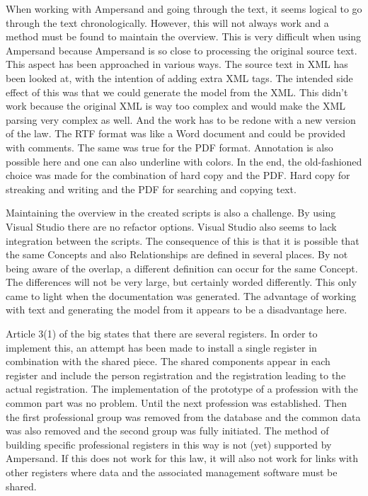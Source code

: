 When working with Ampersand and going through the text, it seems logical to go through the text chronologically.
However, this will not always work and a method must be found to maintain the overview.
This is very difficult when using Ampersand because Ampersand is so close to processing the original source text.
This aspect has been approached in various ways.
The source text in XML has been looked at, with the intention of adding extra XML tags.
The intended side effect of this was that we could generate the model from the XML.
This didn't work because the original XML is way too complex and would make the XML parsing very complex as well.
And the work has to be redone with a new version of the law.
The RTF format was like a Word document and could be provided with comments.
The same was true for the PDF format.
Annotation is also possible here and one can also underline with colors.
In the end, the old-fashioned choice was made for the combination of hard copy and the PDF.
Hard copy for streaking and writing and the PDF for searching and copying text.

Maintaining the overview in the created scripts is also a challenge.
By using Visual Studio there are no refactor options.
Visual Studio also seems to lack integration between the scripts.
The consequence of this is that it is possible that the same Concepts and also Relationships are defined in several places.
By not being aware of the overlap, a different definition can occur for the same Concept.
The differences will not be very large, but certainly worded differently.
This only came to light when the documentation was generated.
The advantage of working with text and generating the model from it appears to be a disadvantage here.

Article 3(1) of the \acrshort{big} states that there are several registers.
In order to implement this, an attempt has been made to install a single register in combination with the shared piece.
The shared components appear in each register and include the person registration and the registration leading to the actual registration.
The implementation of the prototype of a profession with the common part was no problem.
Until the next profession was established.
Then the first professional group was removed from the database and the common data was also removed and the second group was fully initiated.
The method of building specific professional registers in this way is not (yet) supported by Ampersand.
If this does not work for this law, it will also not work for links with other registers where data and the associated management software must be shared.

